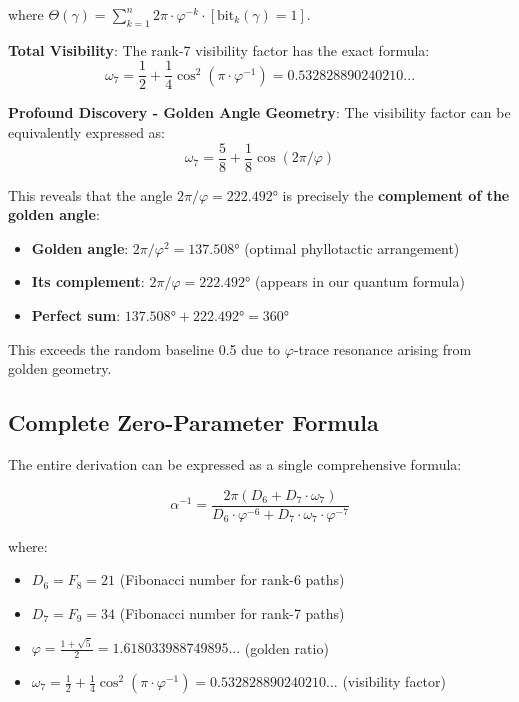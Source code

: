 \documentclass[%
 reprint,
 amsmath,amssymb,
 aps,
 prd,
 10pt,
 nofootinbib,      %
 longbibliography  %
]{revtex4-2}
\theoremstyle{definition}
\theoremstyle{remark}
\begin{document}
where $\Theta(\gamma) = \sum_{k=1}^n 2\pi \cdot \varphi^{-k} \cdot [\text{bit}_k(\gamma) = 1]$.

\textbf{Total Visibility}: The rank-7 visibility factor has the exact formula:
\begin{equation}
\omega_7 = \frac{1}{2} + \frac{1}{4}\cos^2(\pi \cdot \varphi^{-1}) = 0.532828890240210...
\end{equation}

\textbf{Profound Discovery - Golden Angle Geometry}: The visibility factor can be equivalently expressed as:
\begin{equation}
\omega_7 = \frac{5}{8} + \frac{1}{8}\cos(2\pi/\varphi)
\end{equation}

This reveals that the angle $2\pi/\varphi = 222.492°$ is precisely the \textbf{complement of the golden angle}:
\begin{itemize}
\item \textbf{Golden angle}: $2\pi/\varphi^2 = 137.508°$ (optimal phyllotactic arrangement)
\item \textbf{Its complement}: $2\pi/\varphi = 222.492°$ (appears in our quantum formula)
\item \textbf{Perfect sum}: $137.508° + 222.492° = 360°$
\end{itemize}

This exceeds the random baseline 0.5 due to $\varphi$-trace resonance arising from golden geometry.

\subsection{Complete Zero-Parameter Formula}

The entire derivation can be expressed as a single comprehensive formula:

\begin{equation}
\boxed{
\alpha^{-1} = \frac{2\pi \left( D_6 + D_7 \cdot \omega_7 \right)}{D_6 \cdot \varphi^{-6} + D_7 \cdot \omega_7 \cdot \varphi^{-7}}
}
\end{equation}

where:
\begin{itemize}
\item $D_6 = F_8 = 21$ (Fibonacci number for rank-6 paths)
\item $D_7 = F_9 = 34$ (Fibonacci number for rank-7 paths)
\item $\varphi = \frac{1 + \sqrt{5}}{2} = 1.618033988749895...$ (golden ratio)
\item $\omega_7 = \frac{1}{2} + \frac{1}{4}\cos^2(\pi \cdot \varphi^{-1}) = 0.532828890240210...$ (visibility factor)
\end{itemize}
\end{document}
